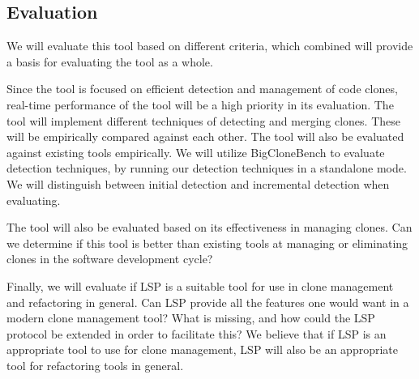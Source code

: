 \documentclass[12pt]{article}
\begin{document}
\subsection{Evaluation}

We will evaluate this tool based on different criteria, which combined will provide a
basis for evaluating the tool as a whole.

Since the tool is focused on efficient detection and management of code clones, real-time
performance of the tool will be a high priority in its evaluation. The tool will implement
different techniques of detecting and merging clones. These will be empirically compared
against each other. The tool will also be evaluated against existing tools empirically. We
will utilize BigCloneBench\cite{BigCloneBench} to evaluate detection techniques, by
running our detection techniques in a standalone mode. We will distinguish between initial
detection and incremental detection when evaluating.

The tool will also be evaluated based on its effectiveness in managing clones. Can we
determine if this tool is better than existing tools at managing or eliminating clones in
the software development cycle?

Finally, we will evaluate if LSP is a suitable tool for use in clone management and
refactoring in general. Can LSP provide all the features one would want in a modern clone
management tool? What is missing, and how could the LSP protocol be extended in order to
facilitate this? We believe that if LSP is an appropriate tool to use for clone
management, LSP will also be an appropriate tool for refactoring tools in general.

\newpage


\end{document}
